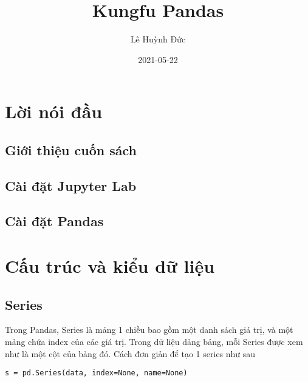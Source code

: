 \documentclass[
]{book}
\title{Kungfu Pandas}
\author{Lê Huỳnh Đức}
\date{2021-05-22}
\begin{document}
\maketitle

{
\setcounter{tocdepth}{1}
\tableofcontents
}
\hypertarget{lux1eddi-nuxf3i-ux111ux1ea7u}{%
\chapter*{Lời nói đầu}\label{lux1eddi-nuxf3i-ux111ux1ea7u}}

\hypertarget{giux1edbi-thiux1ec7u-cuux1ed1n-suxe1ch}{%
\section*{Giới thiệu cuốn sách}\label{giux1edbi-thiux1ec7u-cuux1ed1n-suxe1ch}}

\hypertarget{cuxe0i-ux111ux1eb7t-jupyter-lab}{%
\section*{Cài đặt Jupyter Lab}\label{cuxe0i-ux111ux1eb7t-jupyter-lab}}

\hypertarget{cuxe0i-ux111ux1eb7t-pandas}{%
\section*{Cài đặt Pandas}\label{cuxe0i-ux111ux1eb7t-pandas}}

\hypertarget{cux1ea5u-truxfac-vuxe0-kiux1ec3u-dux1eef-liux1ec7u}{%
\chapter{Cấu trúc và kiểu dữ liệu}\label{cux1ea5u-truxfac-vuxe0-kiux1ec3u-dux1eef-liux1ec7u}}

\hypertarget{series}{%
\section{Series}\label{series}}

Trong Pandas, Series là mảng 1 chiều bao gồm một danh sách giá trị, và một mảng chứa index của các giá trị. Trong dữ liệu dảng bảng, mỗi Series được xem như là một cột của bảng đó. Cách đơn giản để tạo 1 series như sau

\begin{verbatim}
s = pd.Series(data, index=None, name=None)
\end{verbatim}
\end{document}
